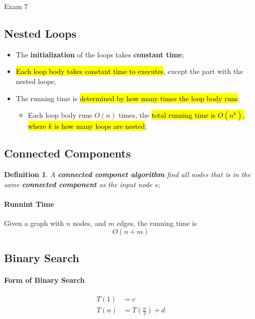\documentclass{note}
\newtheorem{definition}{Definition}
\begin{document}
\begin{note}{Exam 7}
    \subsection{Nested Loops}

    \begin{itemize}
        \item The \textbf{initialization} of the loops takes \textbf{constant time};
        \item \hl{Each loop body takes constant time to executes}, except the part with the nested loops;
        \item The running time is \hl{determined by how many times the loop body runs};
        \begin{itemize}
            \item Each loop body runs $ O \left( n \right) $ times, the \hl{total running time is $ O \left( n^{k} \right) $,
            where $ k $ is how many loops are nested};
        \end{itemize}
    \end{itemize}

    \subsection{Connected Components}

    \begin{definition}
        A \textbf{connected componet algorithm} find all nodes that is in the same \textbf{connected component}
        as the input node $ s $;
    \end{definition}

    \paragraph{Runnint Time}

    Given a graph with $ n $ nodes, and $ m $ edges, the running time is 
    \begin{displaymath}
         O \left( n + m \right) 
    \end{displaymath}

    \subsection{Binary Search}

    \paragraph{Form of Binary Search}
    \begin{align*}
        T(1) &= c \\
        T(n) &= T \left( \frac{n}{2} \right) + d
    \end{align*}


\end{note}
\end{document}
